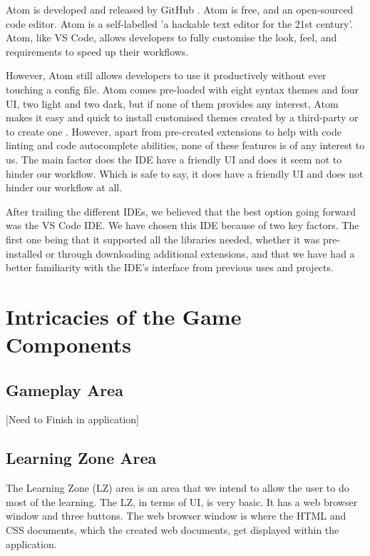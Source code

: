 	
	Atom is developed and released by GitHub \cite{atom_explain}. Atom is free, and an open-sourced code editor. Atom is a self-labelled 'a hackable text editor for the 21st century'. Atom, like VS Code, allows developers to fully customise the look, feel, and requirements to speed up their workflows.
	
	However, Atom still allows developers to use it productively without ever touching a config file. Atom comes pre-loaded with eight syntax themes and four UI, two light and two dark, but if none of them provides any interest, Atom makes it easy and quick to install customised themes created by a third-party or to create one \cite{atom_explain}. However, apart from pre-created extensions to help with code linting and code autocomplete abilities, none of these features is of any interest to us. The main factor does the IDE have a friendly UI and does it seem not to hinder our workflow. Which is safe to say, it does have a friendly UI and does not hinder our workflow at all.
	
	After trailing the different IDEs, we believed that the best option going forward was the VS Code IDE. We have chosen this IDE because of two key factors. The first one being that it supported all the libraries needed, whether it was pre-installed or through downloading additional extensions, and that we have had a better familiarity with the IDE's interface from previous uses and projects.
	
	
	\section{Intricacies of the Game Components}
	\label{sec:packages_used}
	
	\subsection{Gameplay Area}
	[Need to Finish in application]
	
	
	\subsection{Learning Zone Area}
	The Learning Zone (LZ) area is an area that we intend to allow the user to do most of the learning. The LZ, in terms of UI, is very basic. It has a web browser window and three buttons. The web browser window is where the HTML and CSS documents, which the created web documents, get displayed within the application. 
	
